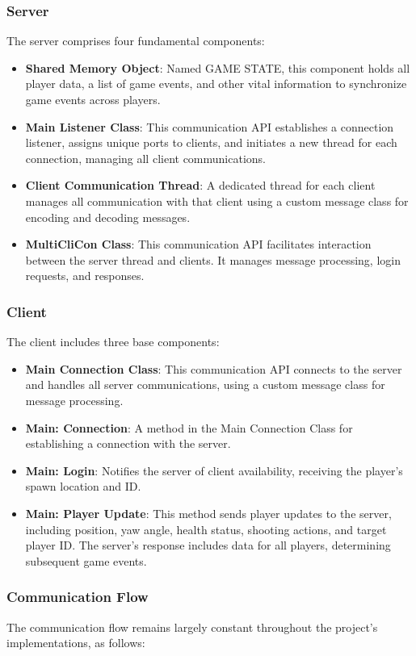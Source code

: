 \subsubsection{Server}
The server comprises four fundamental components:
\begin{itemize}
    \item \textbf{Shared Memory Object}: Named GAME STATE, this component holds all player data, a list of game events, and other vital information to synchronize game events across players.
    \item \textbf{Main Listener Class}: This communication API establishes a connection listener, assigns unique ports to clients, and initiates a new thread for each connection, managing all client communications.
    \item \textbf{Client Communication Thread}: A dedicated thread for each client manages all communication with that client using a custom message class for encoding and decoding messages.
    \item \textbf{MultiCliCon Class}: This communication API facilitates interaction between the server thread and clients. It manages message processing, login requests, and responses.
\end{itemize}

\subsubsection{Client}
The client includes three base components:
\begin{itemize}
    \item \textbf{Main Connection Class}: This communication API connects to the server and handles all server communications, using a custom message class for message processing.
    \item \textbf{Main: Connection}: A method in the Main Connection Class for establishing a connection with the server.
    \item \textbf{Main: Login}: Notifies the server of client availability, receiving the player's spawn location and ID.
    \item \textbf{Main: Player Update}: This method sends player updates to the server, including position, yaw angle, health status, shooting actions, and target player ID. The server's response includes data for all players, determining subsequent game events.
\end{itemize}


\subsubsection{Communication Flow}
\label{sec:communication flow}
The communication flow remains largely constant throughout the project's implementations, as follows:

